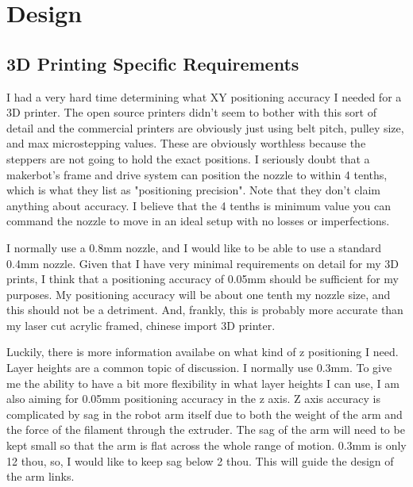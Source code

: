 \documentclass[12pt]{report}
\begin{document}
\begin{comment}
I also need practice designing and CADing parts. Since I am making everything myself, I am forced to deal with how I am going to machine the part while I'm designing it. While this isn't a huge deal for most of the robot, it does present some challenges from time to time. Additionally, while I've had a usable CAD program for years (got an offline license in college), I've never been terribly good at it, as my very simple self-made 3D prints will attest.

A number of parts in the design have non-essential features that present challenges to machine with my setup. These are there because they look nicer and because most of them will be hand filed or similar. My filing is pretty rough, and these parts will give me practice.

\end{comment}


\chapter{Design}
\section{3D Printing Specific Requirements}
I had a very hard time determining what XY positioning accuracy I needed for a 3D printer. The open source printers didn't seem to bother with this sort of detail and the commercial printers are obviously just using belt pitch, pulley size, and max microstepping values. These are obviously worthless because the steppers are not going to hold the exact positions. I seriously doubt that a makerbot's frame and drive system can position the nozzle to within 4 tenths, which is what they list as "positioning precision". Note that they don't claim anything about accuracy. I believe that the 4 tenths is minimum value you can command the nozzle to move in an ideal setup with no losses or imperfections. 

I normally use a 0.8mm nozzle, and I would like to be able to use a standard 0.4mm nozzle. Given that I have very minimal requirements on detail for my 3D prints, I think that a positioning accuracy of 0.05mm should be sufficient for my purposes. My positioning accuracy will be about one tenth my nozzle size, and this should not be a detriment. And, frankly, this is probably more accurate than my laser cut acrylic framed, chinese import 3D printer. 

Luckily, there is more information availabe on what kind of z positioning I need. Layer heights are a common topic of discussion. I normally use 0.3mm. To give me the ability to have a bit more flexibility in what layer heights I can use, I am also aiming for 0.05mm positioning accuracy in the z axis. Z axis accuracy is complicated by sag in the robot arm itself due to both the weight of the arm and the force of the filament through the extruder. The sag of the arm will need to be kept small so that the arm is flat across the whole range of motion. 0.3mm is only 12 thou, so, I would like to keep sag below 2 thou. This will guide the design of the arm links.
\end{document}
